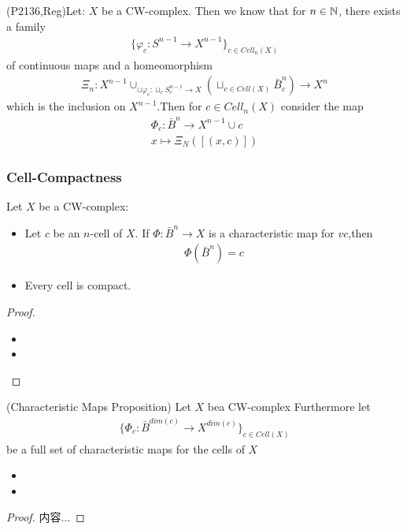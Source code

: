 \documentclass[Total.tex]{subfiles}
\begin{document}
		\begin{Def}
			(P2136,Reg)Let: $X$ be a CW-complex. Then we know that for $n\in \mathbb{N}$, there exists a family
			\begin{gather*}
				\{\varphi_c:S^{n-1}\rightarrow X^{n-1}\}_{c\in Cell_n(X)}
			\end{gather*}
			of continuous maps and a homeomorphism
			\begin{gather*}
				\Xi_n:X^{n-1}\cup_{\sqcup \varphi_c:\sqcup_c S_c^{n-1}\rightarrow X} (\sqcup_{c\in Cell(X)} \bar{B}^n_c)\rightarrow X^n
			\end{gather*}
			which is the inclusion on $X^{n-1}$.Then for $c\in Cell_n(X)$ consider the map
			\begin{gather*}
				\Phi_c:\bar{B}^n\rightarrow X^{n-1}\cup c\\
				x\mapsto \Xi_N([(x,c)])
			\end{gather*} 
		\end{Def}
		\subsubsection{Cell-Compactness}
			\begin{proposition}
				Let $X$ be a CW-complex:
				\begin{itemize}
					\item Let $c$ be an $n$-cell of $X$. If $\Phi:\bar{B}^n\rightarrow X$ is a characteristic map for $vc$,then
					\begin{gather*}
						\Phi(\bar{B}^n)=c
					\end{gather*}
					\item Every cell is compact.
				\end{itemize}
			\end{proposition}
			\begin{proof}
				\begin{itemize}
					\item 
					\item 
				\end{itemize}
			\end{proof}
			
			\begin{proposition}
				(Characteristic Maps Proposition) Let $X$ bea CW-complex Furthermore let
				\begin{gather*}
					\{\Phi_c:\bar{B}^{dim(c)}\rightarrow X^{dim(c)}\}_{c\in Cell(X)}
				\end{gather*}
				be a full set of characteristic maps for the cells of $X$
				\begin{itemize}
					\item 
					\item 
				\end{itemize}
			\end{proposition}
			\begin{proof}
				内容...
			\end{proof}
\end{document}

